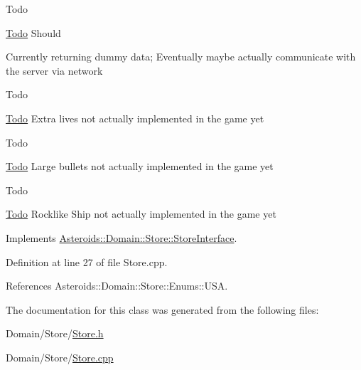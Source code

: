 \begin{DoxyRefDesc}{Todo}
\item[\hyperlink{todo__todo000015}{Todo}]Should 

Currently returning dummy data; Eventually maybe actually communicate with the server via network \end{DoxyRefDesc}
\begin{DoxyRefDesc}{Todo}
\item[\hyperlink{todo__todo000016}{Todo}]Extra lives not actually implemented in the game yet \end{DoxyRefDesc}


\begin{DoxyRefDesc}{Todo}
\item[\hyperlink{todo__todo000017}{Todo}]Large bullets not actually implemented in the game yet \end{DoxyRefDesc}


\begin{DoxyRefDesc}{Todo}
\item[\hyperlink{todo__todo000018}{Todo}]Rocklike Ship not actually implemented in the game yet \end{DoxyRefDesc}


Implements \hyperlink{classAsteroids_1_1Domain_1_1Store_1_1StoreInterface_a26cad8caa421c12c061132691df3f15d}{Asteroids\+::\+Domain\+::\+Store\+::\+Store\+Interface}.



Definition at line 27 of file Store.\+cpp.



References Asteroids\+::\+Domain\+::\+Store\+::\+Enums\+::\+U\+SA.



The documentation for this class was generated from the following files\+:\begin{DoxyCompactItemize}
\item 
Domain/\+Store/\hyperlink{Store_8h}{Store.\+h}\item 
Domain/\+Store/\hyperlink{Store_8cpp}{Store.\+cpp}\end{DoxyCompactItemize}
